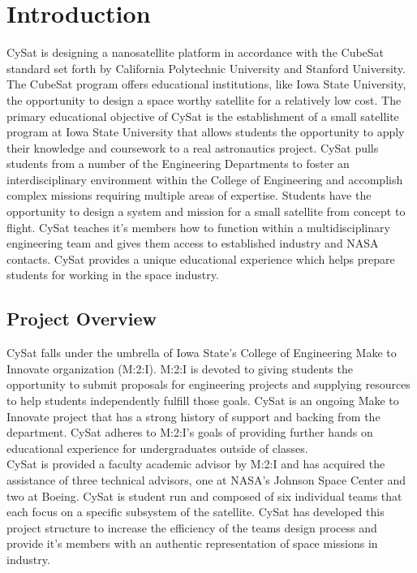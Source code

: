 \documentclass[nocover]            %
{CSLI}                       %
\begin{document}
\newpage

\tableofcontents



\newpage
\section{Introduction}
CySat is designing a nanosatellite platform in accordance with the CubeSat standard set forth by California Polytechnic University and Stanford University. The CubeSat program offers educational institutions, like Iowa State University, the opportunity to design a space worthy satellite for a relatively low cost. The primary educational objective of CySat is the establishment of a small satellite program at Iowa State University that allows students the opportunity to apply their knowledge and coursework to a real astronautics project. CySat pulls students from a number of the Engineering Departments to foster an interdisciplinary environment within the College of Engineering and accomplish complex missions requiring multiple areas of expertise. Students have the opportunity to design a system and mission for a small satellite from concept to flight. CySat teaches it's members how to function within a multidisciplinary engineering team and gives them access to established industry and NASA contacts.  CySat provides a unique educational experience which helps prepare students for working in the space industry.
\subsection{Project Overview}
CySat falls under the umbrella of Iowa State's College of Engineering Make to Innovate organization (M:2:I). M:2:I is devoted to giving students the opportunity to submit proposals for engineering projects and supplying resources to help students independently fulfill those goals. CySat is an ongoing Make to Innovate project that has a strong history of support and backing from the department. CySat adheres to M:2:I's goals of providing further hands on educational experience for undergraduates outside of classes.\\
CySat is provided a faculty academic advisor by M:2:I and has acquired the assistance of three technical advisors, one at NASA's Johnson Space Center and two at Boeing. CySat is student run and composed of six individual teams that each focus on a specific subsystem of the satellite. CySat has developed this project structure to increase the efficiency of the teams design process and provide it's members with an authentic representation of space missions in industry.
\end{document}
